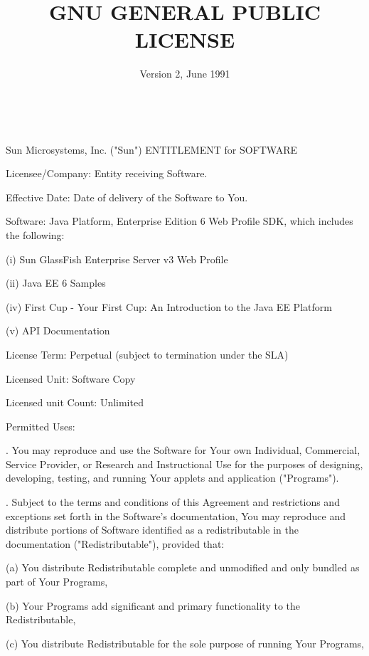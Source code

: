 \title{GNU GENERAL PUBLIC LICENSE}
\date{Version 2, June 1991}
\begin{verbatim}


\end{verbatim}


\par \noindent Sun Microsystems, Inc. ("Sun") ENTITLEMENT for SOFTWARE
\bigskip 
\par \noindent Licensee/Company: Entity receiving Software.
\bigskip 
\par \noindent Effective Date: Date of delivery of the Software to You.
\bigskip 
\par \noindent Software: Java Platform, Enterprise Edition 6 Web Profile SDK, which includes the following: 
\bigskip
\par \noindent (i)     Sun GlassFish Enterprise Server v3 Web Profile
\par \noindent (ii)    Java EE 6 Samples 
\par \noindent (iv)    First Cup - Your First Cup: An Introduction to the Java EE Platform 
\par \noindent (v)     API Documentation
\bigskip 
\par \noindent License Term:  Perpetual (subject to termination under the SLA)
\bigskip 
\par \noindent Licensed Unit: Software Copy
\bigskip 
\par \noindent Licensed unit Count: Unlimited
\bigskip 
\par \noindent Permitted Uses:
\bigskip 
\par {}. You may reproduce and use the Software for Your own Individual, Commercial, Service Provider, or Research and Instructional Use for the purposes of designing, developing, testing, and running Your applets and application ("Programs").
\bigskip 
\par {}. Subject to the terms and conditions of this Agreement and restrictions and exceptions set forth in the Software's documentation, You may reproduce and distribute portions of Software identified as a redistributable in the documentation ("Redistributable"), provided that:
\bigskip 
\par \noindent (a) You distribute Redistributable complete and unmodified and only bundled as part of Your Programs, 
\bigskip 
\par \noindent (b) Your Programs add significant and primary functionality to the Redistributable, 
\bigskip 
\par \noindent (c) You distribute Redistributable for the sole purpose of running Your Programs,

